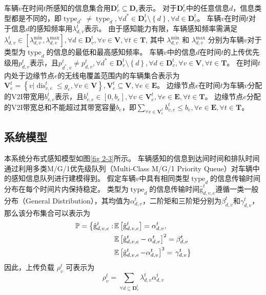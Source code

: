 车辆$v$在时间$t$所感知的信息集合用$\mathbf{D}_v^t\subseteq \mathbf{D}_v$表示。
对于$\mathbf{D}_v^t$中的任意信息$d$，信息类型都是不同的，即$\operatorname{type}_{d^*} \neq \operatorname{type}_{d}, \forall d^* \in \mathbf{D}_v^t \setminus \left\{ d\right \}, \forall d \in \mathbf{D}_v^t$。
车辆$v$在时间$t$对于信息$d$的感知频率用$\lambda_{d,v}^t$表示。
由于感知能力有限，车辆感知频率需满足$\lambda_{d,v}^{t} \in [\lambda_{d,v}^{\min} , \lambda_{d,v}^{\max} ], \forall d \in \mathbf{D}_v^t, \forall v \in \mathbf{V}, \forall t \in \mathbf{T}$, 其中 $\lambda_{d,v}^{\min}$ 和 $\lambda_{d,v}^{\max}$ 分别为车辆$v$对于类型为$\operatorname{type}_{d}$的信息的最低和最高感知频率。
车辆$v$中的信息$d$在时间$t$的上传优先级用$p_{d,v}^t$表示，且${p}_{d^*, v}^t \neq {p}_{d, v}^t, \forall d^* \in \mathbf{D}_v^t \setminus \left\{ d\right \}, \forall d \in \mathbf{D}_v^t, \forall v \in \mathbf{V}, \forall t \in \mathbf{T}$。
在时间$t$内处于边缘节点$e$的无线电覆盖范围内的车辆集合表示为$\mathbf{V}_e^t=\left \{v \vert \operatorname{dis}_{v,e}^t \leq g_e, \forall v \in \mathbf{V} \right \}, \mathbf{V}_e^t \subseteq \mathbf{V}, \forall e \in \mathbf{E}$。
边缘节点$e$在时间$t$为车辆$v$分配的V2I带宽用$b_{v, e}^t$表示，且$b_{v, e}^t \in \left [0,b_e \right], \forall v \in \mathbf{V}_e^{t}, \forall e \in \mathbf{E}, \forall t \in \mathbf{T}$。
边缘节点$e$分配的V2I带宽总和不能超过其带宽容量$b_e$，即${\sum_{\forall v \in \mathbf{V}_e^{t}}b_{v, e}^t} \leq b_e, \forall e \in \mathbf{E}, \forall t \in \mathbf{T}$。

\subsection{系统模型}
本系统分布式感知模型如图\ref{fig 2-3}所示。
车辆感知的信息到达间时间和排队时间通过利用多类M/G/1优先级队列（Multi-Class M/G/1 Priority Queue）\cite{qian2020minimizing}对车辆中的感知信息队列进行建模得到。
假定车辆$v$中具有相同类型$\operatorname{type}_d$的信息传输时间分布在每个时间片内保持稳定。
类型为$\operatorname{type}_d$的信息传输时间$\operatorname{\hat{g}}_{d, v, e}^t$遵循一类一般分布（General Distribution），其均值为$\alpha_{d, v}^t$，二阶矩和三阶矩分别为$\beta_{d, v}^t$和$\gamma_{d, v}^t$，那么该分布集合可以表示为
\begin{align}
	\mathbb{P}=\left\{\hat{\mathrm{g}}_{d, v, e}^t:\right. & \mathbb{E}\left[\hat{\mathrm{g}}_{d, v, e}^t\right]=\alpha_{d, v}^t, \notag \\
	& \mathbb{E}\left[\hat{\mathrm{g}}_{d, v, e}^t-\alpha_{d, v}^t\right]^2=\beta_{d, v}^t \notag \\
	& \mathbb{E}\left[\operatorname{\hat{g}}_{d, v, e}^t-\alpha_{d, v}^t\right]^{3}=\left.\gamma_{d, v}^t \right\}
\end{align}
因此，上传负载 $\rho_{v}^{t}$ 可表示为 
\begin{equation}
    \rho_{v}^{t}=\sum_{\forall d \subseteq \mathbf{D}_v^t} \lambda_{d,v}^{t}  \alpha_{d, v}^t
\end{equation}

